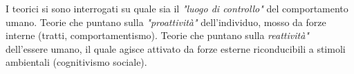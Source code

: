 \documentclass{subfiles}
\begin{document}
I teorici si sono interrogati su quale sia il \textit{"luogo di controllo"} del comportamento umano.
Teorie che puntano sulla \textit{"proattività"} dell'individuo, mosso da forze interne (tratti, comportamentismo).
Teorie che puntano sulla \textit{reattività"} dell'essere umano, il quale agisce attivato da forze esterne riconducibili
a stimoli ambientali (cognitivismo sociale).
\end{document}

